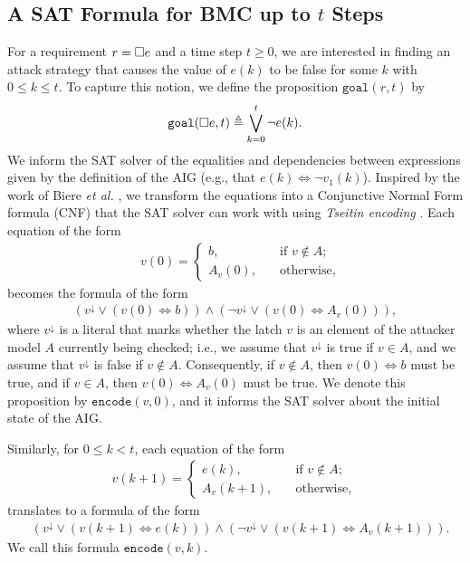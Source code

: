 \subsection{A SAT Formula for BMC up to $t$ Steps}
For a requirement $r={{\square}} e$ and a time step $t\geq 0$, we are interested in finding an attack strategy that causes the value of $e(k)$ to be false for some $k$ with $0\leq k \leq t$. To capture this notion, we define the proposition $\mathtt{goal}(r,t)$ by
\begin{align}
\mathtt{goal}({{\square}} e,t) \triangleq \bigvee_{k=0}^t{\lnot e(k)}.
\end{align}
We inform the SAT solver of the equalities and dependencies between expressions given by the definition of the AIG (e.g., that $e(k) \Leftrightarrow \lnot v_1(k)$). Inspired by the work of Biere \emph{et al.} \cite{BMCWithoutBDDs}, we transform the equations into a Conjunctive Normal Form formula (CNF) that the SAT solver can work with using  \emph{Tseitin encoding} \cite{TseitinEncoding}. Each equation of the form 
\begin{align*}
&v(0)= \begin{cases}
b, \quad &\text{if $v \not \in A$;}\\
A_v(0), \quad &\text{otherwise,}
\end{cases}
\end{align*}
becomes the formula of the form
\begin{align}
{\left(v^{\downarrow} \lor (v(0) \Leftrightarrow b ) \right)\land \left(\lnot v^{\downarrow} \lor (v(0) \Leftrightarrow A_v(0)) \right)},
\end{align}
where $v^{\downarrow}$ is a literal that marks whether the latch $v$ is an element of the attacker model $A$ currently being checked; i.e., we assume that $v^{\downarrow}$ is true if $v\in A$, and we assume that $v^{\downarrow}$ is false if $v\not \in A$. Consequently, if $v\not \in A$, then $v(0) \Leftrightarrow b$ must be true, and if $v \in A$, then $v(0)  \Leftrightarrow A_v(0) $ must be true. We denote this proposition by $\mathtt{encode}(v,0)$, and it informs the SAT solver about the initial state of the AIG.
 
Similarly, for $0\leq k<t$, each equation of the form 
\begin{align*}
&v(k+1) = \begin{cases}
e(k), \quad &\text{if $v\not \in A$;}\\
A_v(k+1), \quad &\text{otherwise},
\end{cases}\quad
\end{align*}
translates to a formula of the form
\begin{align}
&\left(v^{\downarrow} \lor (v(k+1) \Leftrightarrow e(k) ) \right)\land \left(\lnot v^{\downarrow} \lor (v(k+1) \Leftrightarrow A_v(k+1)) \right).
\end{align}
We call this formula $\mathtt{encode}(v,k)$. %

